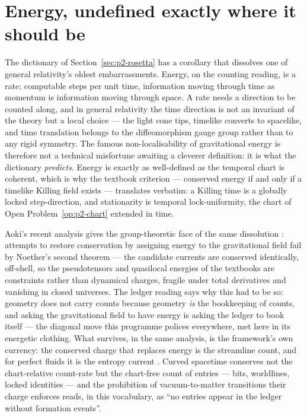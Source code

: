 \documentclass[11pt,a4paper]{article}
\begin{document}
\section{Energy, undefined exactly where it should be}
\label{sec:p2-energy}

The dictionary of Section~\ref{sec:p2-rosetta} has a corollary that dissolves one of general
relativity's oldest embarrassments. Energy, on the counting reading, is a rate: computable steps
per unit time, information moving through time as momentum is information moving through space.
A rate needs a direction to be counted along, and in general relativity the time direction is not
an invariant of the theory but a local choice --- the light cone tips, timelike converts to
spacelike, and time translation belongs to the diffeomorphism gauge group rather than to any rigid
symmetry. The famous non-localisability of gravitational energy is therefore not a technical
misfortune awaiting a cleverer definition: it is what the dictionary \emph{predicts}. Energy is
exactly as well-defined as the temporal chart is coherent, which is why the textbook criterion ---
conserved energy if and only if a timelike Killing field exists --- translates verbatim: a Killing
time is a globally locked step-direction, and stationarity is temporal lock-uniformity, the chart
of Open Problem~\ref{op:p2-chart} extended in time.

Aoki's recent analysis gives the group-theoretic face of the same dissolution
\autocite{aoki2025energy}: attempts to restore conservation by assigning energy to the
gravitational field fail by Noether's second theorem \autocite{noether1918invariante} --- the
candidate currents are conserved identically, off-shell, so the pseudotensors and quasilocal
energies of the textbooks are constraints rather than dynamical charges, fragile under total
derivatives and vanishing in closed universes. The ledger reading says why this had to be so:
geometry does not carry counts because geometry \emph{is} the bookkeeping of counts, and asking
the gravitational field to have energy is asking the ledger to book itself --- the diagonal move
this programme polices everywhere, met here in its energetic clothing. What survives, in the same
analysis, is the framework's own currency: the conserved charge that replaces energy is the
streamline count, and for perfect fluids it is the entropy current
\autocite{aokihidakakawanashimada2025}. Curved spacetime conserves not the chart-relative
count-rate but the chart-free count of entries --- bits, worldlines, locked identities --- and the
prohibition of vacuum-to-matter transitions their charge enforces reads, in this vocabulary, as
``no entries appear in the ledger without formation events''.
\end{document}
